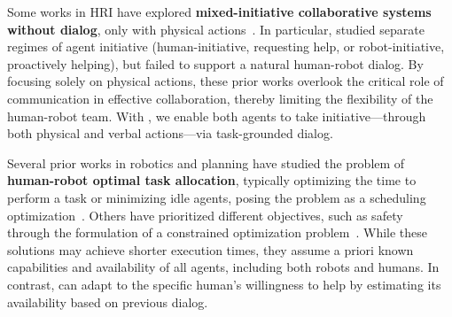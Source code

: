 Some works in HRI have explored \textbf{mixed-initiative collaborative systems without dialog}, only with physical actions~\cite{4107804, natarajan2024mixedinitiativehumanrobotteamingsuboptimality, 9106686, rosero2021cooksunderstandingdynamichumanagent, paleja2024designsenablingcollaborationhumanmachine, 7379306}.
In particular, \cite{7451735} studied separate regimes of agent initiative (human-initiative, requesting help, or robot-initiative, proactively helping), but failed to support a natural human-robot dialog. 
By focusing solely on physical actions, these prior works overlook the critical role of communication in effective collaboration, thereby limiting the flexibility of the human-robot team. With \methodname{}, we enable both agents to take initiative—through both physical and verbal actions—via task-grounded dialog.


Several prior works in robotics and planning have studied the problem of \textbf{human-robot optimal task allocation}, typically optimizing the time to perform a task or minimizing idle agents, posing the problem as a scheduling optimization~\cite{vats2022synergisticschedulinglearningallocation, YU2021487}.
Others have prioritized different objectives, such as safety~\cite{Faccio2024} through the formulation of a constrained optimization problem~\cite{singh2023concurrentconstrainedoptimizationunknown}.
While these solutions may achieve shorter execution times, they assume a priori known capabilities and availability of all agents, including both robots and humans.
In contrast, \methodname{} can adapt to the specific human's willingness to help by estimating its availability based on previous dialog.

